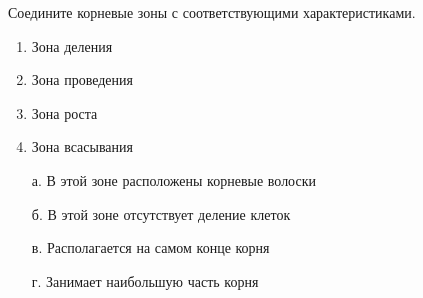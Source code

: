 
Соедините корневые зоны с соответствующими характеристиками.

        \begin{enumerate}
            \item Зона деления
            \item Зона проведения
            \item Зона роста
            \item Зона всасывания
        \end{enumerate}

        \begin{enumerate}
            \item[а.] В этой зоне расположены корневые волоски
            \item[б.] В этой зоне отсутствует деление клеток
            \item[в.] Располагается на самом конце корня
            \item[г.] Занимает наибольшую часть корня
        \end{enumerate}

\explanationSection

